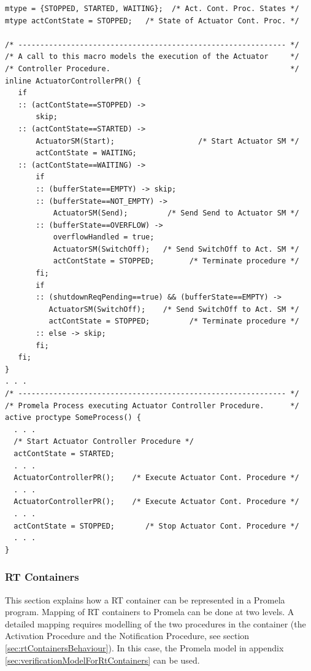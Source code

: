 \documentclass[a4paper,10pt]{article}
\begin{document}
\begin{lstlisting}
mtype = {STOPPED, STARTED, WAITING};  /* Act. Cont. Proc. States */ 
mtype actContState = STOPPED;   /* State of Actuator Cont. Proc. */ 

/* ------------------------------------------------------------- */
/* A call to this macro models the execution of the Actuator     */
/* Controller Procedure.                                         */
inline ActuatorControllerPR() {
   if
   :: (actContState==STOPPED) -> 
       skip;    
   :: (actContState==STARTED) -> 
       ActuatorSM(Start);                   /* Start Actuator SM */  
       actContState = WAITING;
   :: (actContState==WAITING) -> 
       if
       :: (bufferState==EMPTY) -> skip;
       :: (bufferState==NOT_EMPTY) ->
           ActuatorSM(Send);         /* Send Send to Actuator SM */
       :: (bufferState==OVERFLOW) ->
           overflowHandled = true;
           ActuatorSM(SwitchOff);   /* Send SwitchOff to Act. SM */
           actContState = STOPPED;        /* Terminate procedure */
       fi;
       if
       :: (shutdownReqPending==true) && (bufferState==EMPTY) ->
          ActuatorSM(SwitchOff);    /* Send SwitchOff to Act. SM */
          actContState = STOPPED;         /* Terminate procedure */
       :: else -> skip;
       fi;
   fi;
} 
. . .
/* ------------------------------------------------------------- */
/* Promela Process executing Actuator Controller Procedure.      */
active proctype SomeProcess() {
  . . .
  /* Start Actuator Controller Procedure */
  actContState = STARTED;
  . . .
  ActuatorControllerPR();    /* Execute Actuator Cont. Procedure */
  . . .
  ActuatorControllerPR();    /* Execute Actuator Cont. Procedure */
  . . .
  actContState = STOPPED;       /* Stop Actuator Cont. Procedure */
  . . .
}  
\end{lstlisting}

\vspace*{-5mm}
\subsubsection{RT Containers}
This section explains how a RT container can be represented in a Promela program. Mapping of RT containers to Promela can be done at two levels. A detailed mapping requires modelling of the two procedures in the container (the Activation Procedure and the Notification Procedure, see section \ref{sec:rtContainersBehaviour}). In this case, the Promela model in appendix \ref{sec:verificationModelForRtContainers} can be used. 
\end{document}
